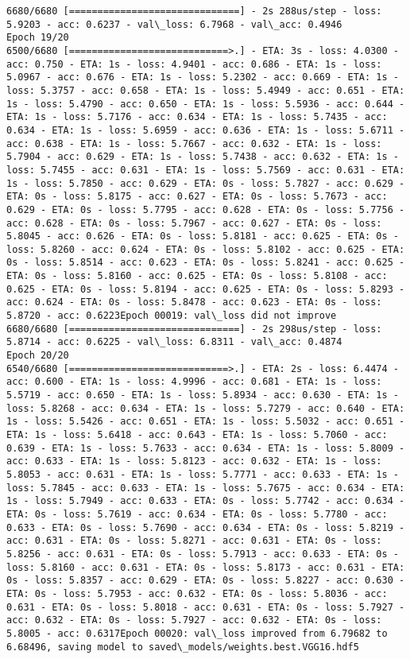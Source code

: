 \documentclass[11pt]{article}
\begin{document}
\begin{Verbatim}[commandchars=\\\{\}]
6680/6680 [==============================] - 2s 288us/step - loss: 5.9203 - acc: 0.6237 - val\_loss: 6.7968 - val\_acc: 0.4946
Epoch 19/20
6500/6680 [============================>.] - ETA: 3s - loss: 4.0300 - acc: 0.750 - ETA: 1s - loss: 4.9401 - acc: 0.686 - ETA: 1s - loss: 5.0967 - acc: 0.676 - ETA: 1s - loss: 5.2302 - acc: 0.669 - ETA: 1s - loss: 5.3757 - acc: 0.658 - ETA: 1s - loss: 5.4949 - acc: 0.651 - ETA: 1s - loss: 5.4790 - acc: 0.650 - ETA: 1s - loss: 5.5936 - acc: 0.644 - ETA: 1s - loss: 5.7176 - acc: 0.634 - ETA: 1s - loss: 5.7435 - acc: 0.634 - ETA: 1s - loss: 5.6959 - acc: 0.636 - ETA: 1s - loss: 5.6711 - acc: 0.638 - ETA: 1s - loss: 5.7667 - acc: 0.632 - ETA: 1s - loss: 5.7904 - acc: 0.629 - ETA: 1s - loss: 5.7438 - acc: 0.632 - ETA: 1s - loss: 5.7455 - acc: 0.631 - ETA: 1s - loss: 5.7569 - acc: 0.631 - ETA: 1s - loss: 5.7850 - acc: 0.629 - ETA: 0s - loss: 5.7827 - acc: 0.629 - ETA: 0s - loss: 5.8175 - acc: 0.627 - ETA: 0s - loss: 5.7673 - acc: 0.629 - ETA: 0s - loss: 5.7795 - acc: 0.628 - ETA: 0s - loss: 5.7756 - acc: 0.628 - ETA: 0s - loss: 5.7967 - acc: 0.627 - ETA: 0s - loss: 5.8045 - acc: 0.626 - ETA: 0s - loss: 5.8181 - acc: 0.625 - ETA: 0s - loss: 5.8260 - acc: 0.624 - ETA: 0s - loss: 5.8102 - acc: 0.625 - ETA: 0s - loss: 5.8514 - acc: 0.623 - ETA: 0s - loss: 5.8241 - acc: 0.625 - ETA: 0s - loss: 5.8160 - acc: 0.625 - ETA: 0s - loss: 5.8108 - acc: 0.625 - ETA: 0s - loss: 5.8194 - acc: 0.625 - ETA: 0s - loss: 5.8293 - acc: 0.624 - ETA: 0s - loss: 5.8478 - acc: 0.623 - ETA: 0s - loss: 5.8720 - acc: 0.6223Epoch 00019: val\_loss did not improve
6680/6680 [==============================] - 2s 298us/step - loss: 5.8714 - acc: 0.6225 - val\_loss: 6.8311 - val\_acc: 0.4874
Epoch 20/20
6540/6680 [============================>.] - ETA: 2s - loss: 6.4474 - acc: 0.600 - ETA: 1s - loss: 4.9996 - acc: 0.681 - ETA: 1s - loss: 5.5719 - acc: 0.650 - ETA: 1s - loss: 5.8934 - acc: 0.630 - ETA: 1s - loss: 5.8268 - acc: 0.634 - ETA: 1s - loss: 5.7279 - acc: 0.640 - ETA: 1s - loss: 5.5426 - acc: 0.651 - ETA: 1s - loss: 5.5032 - acc: 0.651 - ETA: 1s - loss: 5.6418 - acc: 0.643 - ETA: 1s - loss: 5.7060 - acc: 0.639 - ETA: 1s - loss: 5.7633 - acc: 0.634 - ETA: 1s - loss: 5.8009 - acc: 0.633 - ETA: 1s - loss: 5.8123 - acc: 0.632 - ETA: 1s - loss: 5.8053 - acc: 0.631 - ETA: 1s - loss: 5.7771 - acc: 0.633 - ETA: 1s - loss: 5.7845 - acc: 0.633 - ETA: 1s - loss: 5.7675 - acc: 0.634 - ETA: 1s - loss: 5.7949 - acc: 0.633 - ETA: 0s - loss: 5.7742 - acc: 0.634 - ETA: 0s - loss: 5.7619 - acc: 0.634 - ETA: 0s - loss: 5.7780 - acc: 0.633 - ETA: 0s - loss: 5.7690 - acc: 0.634 - ETA: 0s - loss: 5.8219 - acc: 0.631 - ETA: 0s - loss: 5.8271 - acc: 0.631 - ETA: 0s - loss: 5.8256 - acc: 0.631 - ETA: 0s - loss: 5.7913 - acc: 0.633 - ETA: 0s - loss: 5.8160 - acc: 0.631 - ETA: 0s - loss: 5.8173 - acc: 0.631 - ETA: 0s - loss: 5.8357 - acc: 0.629 - ETA: 0s - loss: 5.8227 - acc: 0.630 - ETA: 0s - loss: 5.7953 - acc: 0.632 - ETA: 0s - loss: 5.8036 - acc: 0.631 - ETA: 0s - loss: 5.8018 - acc: 0.631 - ETA: 0s - loss: 5.7927 - acc: 0.632 - ETA: 0s - loss: 5.7927 - acc: 0.632 - ETA: 0s - loss: 5.8005 - acc: 0.6317Epoch 00020: val\_loss improved from 6.79682 to 6.68496, saving model to saved\_models/weights.best.VGG16.hdf5

\end{Verbatim}
\end{document}
